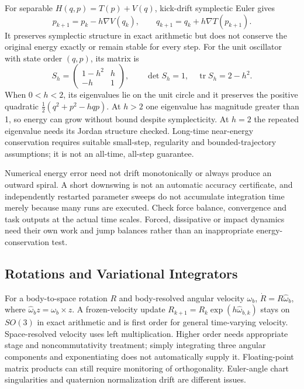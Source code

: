For separable $H(q,p)=T(p)+V(q)$, kick-drift symplectic Euler gives
\begin{equation}
p_{k+1}=p_k-h\nabla V(q_k),\qquad
q_{k+1}=q_k+h\nabla T(p_{k+1}).
\end{equation}
It preserves symplectic structure in exact arithmetic but does not conserve the original energy exactly or remain stable for every step. For the unit oscillator with state order $(q,p)$, its matrix is
\begin{equation}
S_h=\begin{pmatrix}1-h^2&h\\-h&1\end{pmatrix},
\qquad \det S_h=1,\quad\operatorname{tr}S_h=2-h^2.
\end{equation}
When $0<h<2$, its eigenvalues lie on the unit circle and it preserves the positive quadratic $\tfrac12(q^2+p^2-hqp)$. At $h>2$ one eigenvalue has magnitude greater than 1, so energy can grow without bound despite symplecticity. At $h=2$ the repeated eigenvalue needs its Jordan structure checked. Long-time near-energy conservation requires suitable small-step, regularity and bounded-trajectory assumptions; it is not an all-time, all-step guarantee.

Numerical energy error need not drift monotonically or always produce an outward spiral. A short downswing is not an automatic accuracy certificate, and independently restarted parameter sweeps do not accumulate integration time merely because many runs are executed. Check force balance, convergence and task outputs at the actual time scales. Forced, dissipative or impact dynamics need their own work and jump balances rather than an inappropriate energy-conservation test.

\subsection{Rotations and Variational Integrators}

For a body-to-space rotation $R$ and body-resolved angular velocity $\omega_b$, $\dot R=R\widehat\omega_b$, where $\widehat\omega_b z=\omega_b\times z$. A frozen-velocity update $R_{k+1}=R_k\exp(h\widehat\omega_{b,k})$ stays on $SO(3)$ in exact arithmetic and is first order for general time-varying velocity. Space-resolved velocity uses left multiplication. Higher order needs appropriate stage and noncommutativity treatment; simply integrating three angular components and exponentiating does not automatically supply it. Floating-point matrix products can still require monitoring of orthogonality. Euler-angle chart singularities and quaternion normalization drift are different issues.

